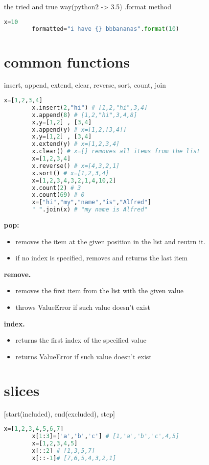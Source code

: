 \documentclass[10pt]{article}
\begin{document}
the tried and true way(python2 -> 3.5) .format method
\begin{lstlisting}[language=Python]
		x=10
		formatted="i have {} bbbananas".format(10)
\end{lstlisting}
\section{common functions}
insert, append, extend, clear, reverse, sort, count, join
\begin{lstlisting}[language=Python]
		x=[1,2,3,4]
		x.insert(2,"hi") # [1,2,"hi",3,4]
		x.append(8) # [1,2,"hi",3,4,8]
		x,y=[1,2] , [3,4]
		x.append(y) # x=[1,2,[3,4]]
		x,y=[1,2] , [3,4]
		x.extend(y) # x=[1,2,3,4]
		x.clear() # x=[] removes all items from the list
		x=[1,2,3,4]
		x.reverse() # x=[4,3,2,1]
		x.sort() # x=[1,2,3,4]
		x=[1,2,3,4,3,2,1,4,10,2]
		x.count(2) # 3
		x.count(69) # 0
		x=["hi","my","name","is","Alfred"]
		" ".join(x) # "my name is Alfred"
\end{lstlisting}
\textbf{pop:}
\begin{itemize}
	\item removes the item at the given position in the list and reutrn it.
	\item if no index is specified, removes and returns the last item
\end{itemize}
\textbf{remove.}
\begin{itemize}
	\item removes the first item from the list with the given value
	\item throws ValueError if such value doesn't exist
\end{itemize}
\textbf{index.}
\begin{itemize}
	\item returns the first index of the specified value
	\item returns ValueError if such value doesn't exist
\end{itemize}
\section{slices}
[start(included), end(excluded), step]
\begin{lstlisting}[language=Python]
		x=[1,2,3,4,5,6,7]
		x[1:3]=['a','b','c'] # [1,'a','b','c',4,5]
		x=[1,2,3,4,5]
		x[::2] # [1,3,5,7]
		x[::-1]# [7,6,5,4,3,2,1]
\end{lstlisting}
\end{document}
